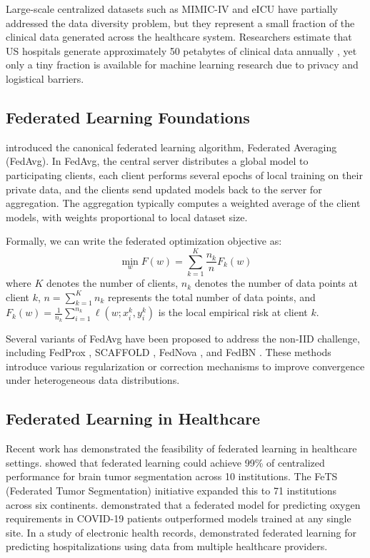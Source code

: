 \documentclass[12pt,letterpaper]{article}
\begin{document}
Large-scale centralized datasets such as MIMIC-IV \citep{Johnson2023} and eICU \citep{Pollard2018} have partially addressed the data diversity problem, but they represent a small fraction of the clinical data generated across the healthcare system. Researchers estimate that US hospitals generate approximately 50 petabytes of clinical data annually \citep{Raghupathi2014}, yet only a tiny fraction is available for machine learning research due to privacy and logistical barriers.

\subsection{Federated Learning Foundations}

\citet{McMahan2017} introduced the canonical federated learning algorithm, Federated Averaging (FedAvg). In FedAvg, the central server distributes a global model to participating clients, each client performs several epochs of local training on their private data, and the clients send updated models back to the server for aggregation. The aggregation typically computes a weighted average of the client models, with weights proportional to local dataset size.

Formally, we can write the federated optimization objective as:
\begin{equation}
\min_{w} F(w) = \sum_{k=1}^{K} \frac{n_k}{n} F_k(w)
\label{eq:fedavg}
\end{equation}
where $K$ denotes the number of clients, $n_k$ denotes the number of data points at client $k$, $n = \sum_{k=1}^{K} n_k$ represents the total number of data points, and $F_k(w) = \frac{1}{n_k} \sum_{i=1}^{n_k} \ell(w; x_i^k, y_i^k)$ is the local empirical risk at client $k$.

Several variants of FedAvg have been proposed to address the non-IID challenge, including FedProx \citep{Li2020fedprox}, SCAFFOLD \citep{Karimireddy2020}, FedNova \citep{Wang2020}, and FedBN \citep{Li2021fedbn}. These methods introduce various regularization or correction mechanisms to improve convergence under heterogeneous data distributions.

\subsection{Federated Learning in Healthcare}

Recent work has demonstrated the feasibility of federated learning in healthcare settings. \citet{Sheller2020} showed that federated learning could achieve 99\% of centralized performance for brain tumor segmentation across 10 institutions. The FeTS (Federated Tumor Segmentation) initiative \citep{Pati2022} expanded this to 71 institutions across six continents. \citet{Dayan2021} demonstrated that a federated model for predicting oxygen requirements in COVID-19 patients outperformed models trained at any single site. In a study of electronic health records, \citet{Brisimi2018} demonstrated federated learning for predicting hospitalizations using data from multiple healthcare providers.
\end{document}
